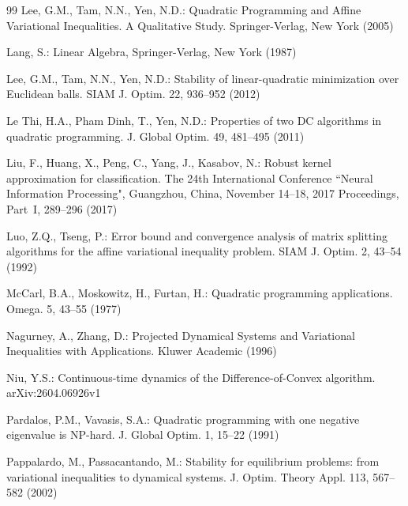 \documentclass[11pt]{article}
\theoremstyle{definition}
\theoremstyle{remark}
\begin{document}
\begin{thebibliography}{99}
	 Lee, G.M., Tam, N.N.,  Yen, N.D.: Quadratic Programming and Affine Variational Inequalities. A Qualitative Study. Springer-Verlag, New York (2005)
	
	 Lang, S.: Linear Algebra, Springer-Verlag, New York (1987)
	
	   Lee, G.M., Tam, N.N., Yen, N.D.: Stability of linear-quadratic minimization over Euclidean balls. SIAM J. Optim. 22, 936--952 (2012)
	
	  Le Thi, H.A., Pham Dinh, T., Yen, N.D.: Properties of two DC algorithms in quadratic programming. J. Global Optim. 49, 481--495 (2011)
	
	
	
	 Liu, F., Huang, X., Peng, C., Yang, J., Kasabov, N.:  Robust kernel approximation for classification. The 24th International Conference ``Neural Information Processing", Guangzhou, China, November 14--18, 2017 Proceedings, Part~I, 289--296 (2017)
	
	
	  Luo, Z.Q., Tseng, P.: Error bound and convergence analysis of matrix
	splitting algorithms for the affine variational inequality problem. SIAM J.
	Optim. 2, 43--54 (1992)
	
	
	
	  McCarl, B.A., Moskowitz, H., Furtan, H.: Quadratic programming applications. Omega. 5, 43--55 (1977)
	
	 Nagurney, A., Zhang, D.: Projected Dynamical Systems and Variational Inequalities with Applications. Kluwer Academic (1996) 
	
	 Niu, Y.S.: Continuous-time dynamics of the	Difference-of-Convex algorithm.  arXiv:2604.06926v1
	
	 Pardalos, P.M., Vavasis, S.A.: Quadratic programming with one negative eigenvalue is NP-hard. J. Global Optim. 1, 15--22 (1991) 
	
	 Pappalardo, M., Passacantando, M.: Stability for equilibrium problems: from variational inequalities to dynamical systems. J. Optim. Theory Appl. 113, 567--582 (2002)
	

\end{thebibliography}
\end{document}
